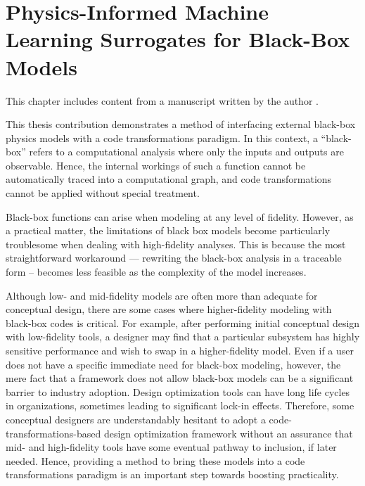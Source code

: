 \chapter{Physics-Informed Machine Learning Surrogates for Black-Box Models}
\label{chap:physics-informed-ml}

\begin{attrib}
    This chapter includes content from a manuscript written by the author \cite{neuralfoil_preprint, neuralfoil_github}.
\end{attrib}

This thesis contribution demonstrates a method of interfacing external black-box physics models with a code transformations paradigm. In this context, a ``black-box'' refers to a computational analysis where only the inputs and outputs are observable. Hence, the internal workings of such a function cannot be automatically traced into a computational graph, and code transformations cannot be applied without special treatment.

Black-box functions can arise when modeling at any level of fidelity. However, as a practical matter, the limitations of black box models become particularly troublesome when dealing with high-fidelity analyses. This is because the most straightforward workaround — rewriting the black-box analysis in a traceable form -- becomes less feasible as the complexity of the model increases.

Although low- and mid-fidelity models are often more than adequate for conceptual design, there are some cases where higher-fidelity modeling with black-box codes is critical. For example, after performing initial conceptual design with low-fidelity tools, a designer may find that a particular subsystem has highly sensitive performance and wish to swap in a higher-fidelity model. Even if a user does not have a specific immediate need for black-box modeling, however, the mere fact that a framework does not allow black-box models can be a significant barrier to industry adoption. Design optimization tools can have long life cycles in organizations, sometimes leading to significant lock-in effects. Therefore, some conceptual designers are understandably hesitant to adopt a code-transformations-based design optimization framework without an assurance that mid- and high-fidelity tools have some eventual pathway to inclusion, if later needed. Hence, providing a method to bring these models into a code transformations paradigm is an important step towards boosting practicality.

